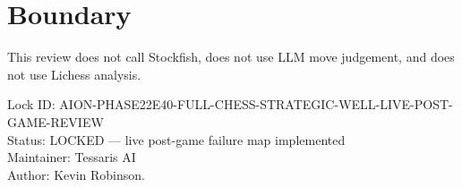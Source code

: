 \documentclass[11pt,a4paper]{article}
\begin{document}
\section{Boundary}

This review does not call Stockfish, does not use LLM move judgement, and does not use Lichess analysis.

\bigskip

\noindent
Lock ID: AION-PHASE22E40-FULL-CHESS-STRATEGIC-WELL-LIVE-POST-GAME-REVIEW\\
Status: LOCKED --- live post-game failure map implemented\\
Maintainer: Tessaris AI\\
Author: Kevin Robinson.
\end{document}
